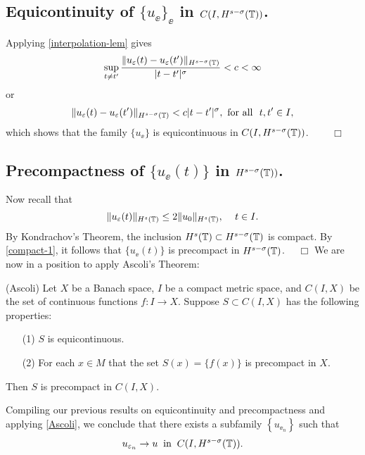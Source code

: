 \subsection{Equicontinuity of $\{u_\ee\}_\ee$  in
$C(I,H^{s-\sigma}(\mathbb{T}))$.} Applying  \cref{interpolation-lem} gives 
%
\begin{equation}
\label{equic-1}
\sup_{t \neq t'} \frac {\|u_\varepsilon(t) - u_\varepsilon(t') \|_{H^{s -
\sigma}(\mathbb{T})}}{|t - t'|^\sigma} < c<\infty
\end{equation}
%
or
%
\begin{equation}
\label{equic-2}
\|u_\varepsilon(t) - u_\varepsilon(t') \|_{H^{s - \sigma}(\mathbb{T})}< c|t - t'|^\sigma, 
 \ \text{for all} \  \,\,  t, t'\in I,
\end{equation}
%
which shows that  the family  $\{u_\ee\}$ is equicontinuous in 
$C(I, H^{s-\sigma}(\mathbb{T}))$. $\qquad \Box$
%
%
%
%
%
%
%
%
%
%
%		
\subsection{Precompactness of $\{u_\ee(t)\}$ in $H^{s-\sigma}(\mathbb{T}))$.}
Now recall that
\begin{equation}
\label{compact-1}
\|u_\varepsilon(t)\|_{H^{s}(\mathbb{T})}
\le
2 \|u_0 \|_{H^s(\mathbb{T})}, \,
\quad
t\in I.
\end{equation}
%
By Kondrachov's Theorem, the inclusion $H^s(\mathbb{T}) \subset H^{s-
\sigma }(\mathbb{T})$ is compact. By \eqref{compact-1},
it follows that $\{u_\ee(t)\}$ is precompact in $H^{s-\sigma}(\mathbb{T})$.
$\quad \Box$
%
%
%
%
We are now in a position to apply Ascoli's Theorem: 
\begin{theorem}
\label{Ascoli}
(Ascoli)  Let $X$ be a Banach space, $I$ be a compact metric space,
and $C(I,X)$  be the set of continuous functions $f: I\longrightarrow X$.
Suppose $S \subset C(I,X)$  has the following properties:
%
\begin{itemize}
\item[(1)]   $S$ is  equicontinuous.
\item[(2)]  For each $x \in M$ that the set $S(x) = \{f(x)\}$  is  precompact in $X$.
\end{itemize} 
%
Then $S$  is  precompact  in  $C(I,X)$.
\end{theorem}
Compiling our previous results on equicontinuity and precompactness
and applying \cref{Ascoli}, we
conclude that there exists a subfamily $\left\{ u_{\ee_n} \right\}$
such that
\begin{equation}
\label{strong-conv-of-u_ep}
u_{\varepsilon_n} \to u \; \; \text{in} \; \; C(I, H^{s-\sigma}(\mathbb{T})).
\end{equation}
%
%
%
%
%
%
%
